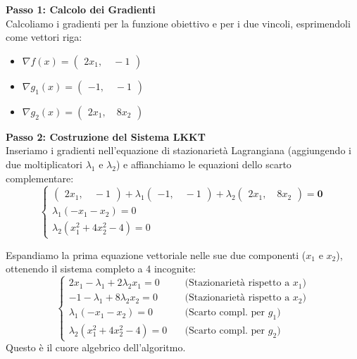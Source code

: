 \documentclass[12pt, a4paper]{article}
\begin{document}
	\textbf{Passo 1: Calcolo dei Gradienti}\\
	Calcoliamo i gradienti per la funzione obiettivo e per i due vincoli, esprimendoli come vettori riga:
	\begin{itemize}
		\item $\nabla f(x) = \begin{pmatrix} 2x_1, \quad -1 \end{pmatrix}$
		\item $\nabla g_1(x) = \begin{pmatrix} -1, \quad -1 \end{pmatrix}$
		\item $\nabla g_2(x) = \begin{pmatrix} 2x_1, \quad 8x_2 \end{pmatrix}$
	\end{itemize}
	
	\textbf{Passo 2: Costruzione del Sistema LKKT}\\
	Inseriamo i gradienti nell'equazione di stazionarietà Lagrangiana (aggiungendo i due moltiplicatori $\lambda_1$ e $\lambda_2$) e affianchiamo le equazioni dello scarto complementare:
	\[
	\begin{cases}
		\begin{pmatrix} 2x_1, \quad -1 \end{pmatrix} + \lambda_1 \begin{pmatrix} -1, \quad -1 \end{pmatrix} + \lambda_2 \begin{pmatrix} 2x_1, \quad 8x_2 \end{pmatrix} = \mathbf{0} \\[6pt]
		\lambda_1 (-x_1 - x_2) = 0 \\
		\lambda_2 (x_1^2 + 4x_2^2 - 4) = 0
	\end{cases}
	\]
	
	Espandiamo la prima equazione vettoriale nelle sue due componenti ($x_1$ e $x_2$), ottenendo il sistema completo a 4 incognite:
	\[
	\begin{cases}
		2x_1 - \lambda_1 + 2\lambda_2 x_1 = 0 \quad &\text{(Stazionarietà rispetto a } x_1 \text{)} \\
		-1 - \lambda_1 + 8\lambda_2 x_2 = 0 \quad &\text{(Stazionarietà rispetto a } x_2 \text{)} \\
		\lambda_1 (-x_1 - x_2) = 0 \quad &\text{(Scarto compl. per } g_1 \text{)} \\
		\lambda_2 (x_1^2 + 4x_2^2 - 4) = 0 \quad &\text{(Scarto compl. per } g_2 \text{)}
	\end{cases}
	\]
	Questo è il cuore algebrico dell'algoritmo. 
	
\end{document}

